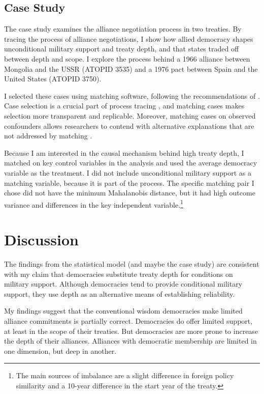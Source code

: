 \documentclass[12pt]{article}
\begin{document}
\subsection{Case Study}


The case study examines the alliance negotiation process in two treaties. 
By tracing the process of alliance negotiations, I show how allied democracy shapes unconditional military support and treaty depth, and that states traded off between depth and scope. 
I explore the process behind a 1966 alliance between Mongolia and the USSR (ATOPID 3535) and a 1976 pact between Spain and the United States (ATOPID 3750). 


I selected these cases using matching software, following the recommendations of \citet{Nielsen2016}. 
Case selection is a crucial part of process tracing \citep{SeawrightGerring2008}, and matching cases makes selection more transparent and replicable. 
Moreover, matching cases on observed confounders allows researchers to contend with alternative explanations that are not addressed by matching \citep{Nielsen2016}. 


Because I am interested in the causal mechanism behind high treaty depth, I matched on key control variables in the analysis and used the average democracy variable as the treatment. 
I did not include unconditional military support as a matching variable, because it is part of the process. 
The specific matching pair I chose did not have the minimum Mahalanobis distance, but it had high outcome variance and differences in the key independent variable.\footnote{The main sources of imbalance are a slight difference in foreign policy similarity and a 10-year difference in the start year of the treaty.} 


\section{Discussion}


The findings from the statistical model (and maybe the case study) are consistent with my claim that democracies substitute treaty depth for conditions on military support. 
Although democracies tend to provide conditional military support, they use depth as an alternative means of 
establishing reliability. 

 
My findings suggest that the conventional wisdom democracies make limited alliance commitments is partially correct.
Democracies do offer limited support, at least in the scope of their treaties. 
But democracies are more prone to increase the depth of their alliances. 
Alliances with democratic membership are limited in one dimension, but deep in another. 
\end{document}
